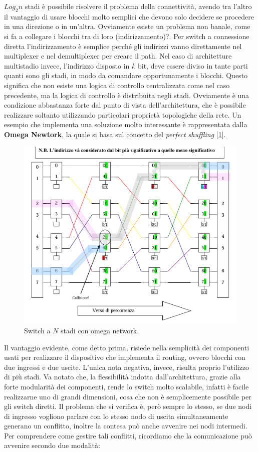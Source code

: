 \(Log_2n\) stadi è possibile risolvere il problema della connettività, avendo tra l'altro il vantaggio di usare blocchi molto semplici che devono solo decidere se 
procedere in una direzione o in un'altra. Ovviamente esiste un problema non banale, come si fa a collegare i blocchi tra di loro (indirizzamento)?. Per switch a connessione diretta l’indirizzamento è semplice perché gli indirizzi vanno direttamente nel multiplexer e nel demultiplexer per creare il path. Nel caso di architetture multistadio invece, l'indirizzo disposto in \(k\) bit, deve essere diviso in tante parti quanti sono gli stadi, in modo da comandare opportunamente i blocchi. Questo significa che non esiste una logica di controllo centralizzata come nel caso precedente, ma la logica di controllo è distribuita negli stadi. Ovviamente è una condizione abbastanza forte dal punto di vista dell'architettura, che è possibile realizzare soltanto utilizzando particolari proprietà topologiche della rete. Un esempio che implementa una soluzione molto interessante è rappresentata dalla \textbf{Omega Newtork}, la quale si basa sul concetto del \textit{perfect shuffling} [\ref{fig:omega}].  
\begin{figure}[!h]
    \centering
    \includegraphics[width=0.6\linewidth]{img/omeganet.png}
    \caption{Switch a \(N\) stadi con omega network.}
    \label{fig:omega}
\end{figure}
Il vantaggio evidente, come detto prima, risiede nella semplicità dei componenti usati per realizzare il dispositivo che implementa il routing, ovvero blocchi con due ingressi e due uscite. L’unica nota negativa, invece, risulta proprio l'utilizzo di più stadi. Va notato che, la flessibilità indotta dall'architettura, grazie alla forte modularità dei componenti, rende lo switch molto scalabile, infatti  è facile realizzarne uno di grandi dimensioni, cosa che non è semplicemente possibile per gli switch diretti. Il problema che si verifica è, però sempre lo stesso, se due nodi di ingresso vogliono parlare con lo stesso nodo di uscita simultaneamente generano un conflitto, inoltre la contesa può anche avvenire nei nodi intermedi. Per comprendere come gestire tali conflitti, ricordiamo che la comunicazione può avvenire secondo due modalità:

